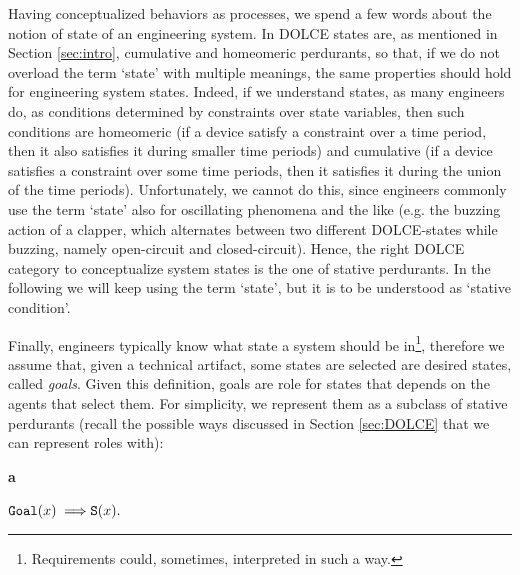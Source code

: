 \documentclass[sw]{iosart2x}
\newcommand{\bflist}{\begin{list}{}{\setlength{\topsep}{2mm}\setlength{\partopsep}{0mm}\setlength{\parsep}{0mm}\setlength{\leftmargin}{9mm}\setlength{\labelwidth}{8mm}}}
\newcommand{\eflist}{\end{list}}
\newcommand{\AxLabel}{\textrm{a}}
\newcounter{cntax}
\newcommand{\myax}[1]{\refstepcounter{cntax}\begin{small}{\bf \AxLabel\thecntax\label{ax:#1}}\end{small}}
\newcommand{\generalStyle}[1]{\texttt{#1}}
\newcommand{\uniRel}[2]{\generalStyle{#1}(#2)}
\newcommand{\myfi}{\hspace{0.9mm} \Longrightarrow}
\newcommand{\DOLCE}{\textsc{DOLCE}\xspace} %
\newcommand{\DOLCEStative}[1]{\uniRel{{S}}{#1}}
\newcommand{\Goal}[1]{\uniRel{Goal}{#1}}
\newcommand{\firstTimeKeyWord}[1]{\textit{#1}}
\newcommand{\stateVarCond}[1]{%
  \ifthenelse{\equal{#1}{fullSingular}}{system condition}{%
    \ifthenelse{\equal{#1}{shortSingular}}{condition}{%
      \ifthenelse{\equal{#1}{fullPlural}}{system conditions}{%
        \ifthenelse{\equal{#1}{shortPlural}}{conditions}{%
          ERROR!%
        }%
      }%
    }%
  }%
}
\newcommand{\quotes}[1]{`#1'}
\begin{document}
Having conceptualized behaviors as processes, we spend a few words about the notion of state of an engineering system.
In \DOLCE states are, as mentioned in Section \ref{sec:intro}, cumulative and homeomeric perdurants, so that, if we do not overload the term \quotes{state} with multiple meanings, the same properties should hold for engineering system states.
Indeed, if we understand states, as many engineers do, as conditions determined by constraints over state variables, then such conditions are homeomeric (if a device satisfy a constraint over a time period, then it also satisfies it during smaller time periods) and cumulative (if a device satisfies a constraint over some time periods, then it satisfies it during the union of the time periods).
Unfortunately, we cannot do this, since engineers commonly use the term \quotes{state} also for oscillating phenomena and the like (e.g. the buzzing action of a clapper, which alternates between two different \DOLCE-states while buzzing, namely open-circuit and closed-circuit). 
Hence, the right \DOLCE category to conceptualize system states is the one of stative perdurants. 
In the following we will keep using the term \quotes{state}, but it is to be understood as \quotes{stative condition}.

Finally, engineers typically know what state a system should be in\footnote{Requirements could, sometimes, interpreted in such a way.}, therefore we assume that, given a technical artifact, some states are selected are desired states, called \firstTimeKeyWord{goals}.
Given this definition, goals are role for states that depends on the agents that select them.
For simplicity, we represent them as a subclass of stative perdurants (recall the possible ways discussed in Section \ref{sec:DOLCE} that we can represent roles with):
\bflist
  \item[\myax{goalSubsum}] $ \Goal{x} \myfi \DOLCEStative{x}. $
\eflist


\end{document}
